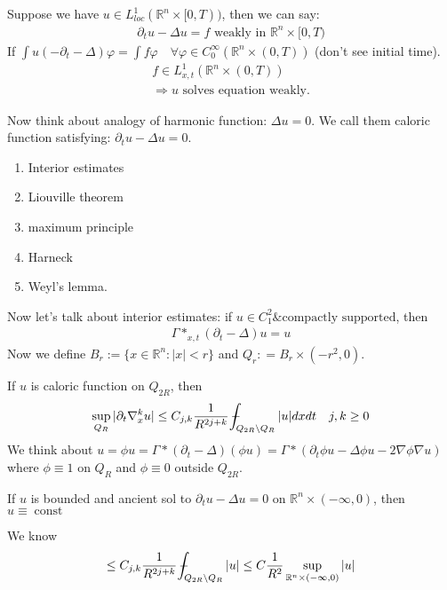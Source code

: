\documentclass[11pt]{article}
\begin{document}
\begin{remark}
    Suppose we have $u \in L^{1}_{loc}(\mathbb{R}^{n} \times [0, T))$, then we can say:
    \begin{align*}
        \partial_{t}u - \Delta u = f \text{ weakly in }\mathbb{R}^{n}\times[0,T)
    \end{align*}
    If $\int u (-\partial_{t} - \Delta)\varphi = \int f \varphi \quad \forall \varphi \in 
    C^{\infty}_{0}(\mathbb{R}^{n} \times (0,T))$ (don't see initial time).
    \begin{align*}
        f \in L^{1}_{x,t}(\mathbb{R}^{n} \times (0,T))\\
        \Longrightarrow u \text{ solves equation weakly.}
    \end{align*}
\end{remark}

Now think about analogy of harmonic function: $\Delta u = 0$.
We call them caloric function satisfying: $\partial_{t}u - \Delta u = 0$.

\begin{enumerate}
    \item Interior estimates
    \item Liouville theorem 
    \item maximum principle 
    \item Harneck
    \item Weyl's lemma.
\end{enumerate}

Now let's talk about interior estimates: if $u \in C^{2}_{1} \& \text{compactly supported}$, then 
\begin{align*}
    \Gamma \ast_{x,t}(\partial_{t} - \Delta)u = u
\end{align*}
Now we define $B_{r} := \{ x\in \mathbb{R}^{n}: |x| < r \}$ and $Q_{r} : =
B_{r} \times (-r^{2}, 0)$.

If $u$ is caloric function on $Q_{2R}$, then
\begin{equation}
    \sup_{Q_{R}}|\partial_{t}\nabla_{x}^{k}u| \le C_{j,k} \frac{1}{R^{2j+k}} 
    \barint_{Q_{2R}\setminus Q_{R}}|u| dxdt \quad j,k \ge 0
\end{equation}
We think about $u = \phi u
= \Gamma \ast (\partial_{t} - \Delta)(\phi u) = \Gamma \ast 
(\partial_{t}\phi u - \Delta \phi u - 2\nabla \phi \nabla u)$ 
where $\phi \equiv 1$ on $Q_{R}$ and $\phi \equiv 0$ outside $Q_{2R}$.


\begin{theorem}[Liouville]
    If $u$ is bounded and ancient sol to 
    $\partial_{t}u - \Delta u = 0$ on $\mathbb{R}^{n} \times (-\infty,0)$, then 
    $u \equiv \operatorname{const}$
\end{theorem}
\begin{remark}
    We know 
    \begin{align*}
        \le C_{j,k} \frac{1}{R^{2j+k}} 
    \barint_{Q_{2R}\setminus Q_{R}}|u| \le C \frac{1}{R^{2}}\sup_{\mathbb{R}^{n} \times (-\infty,0)}
    |u|
    \end{align*}
\end{remark}
\end{document}
